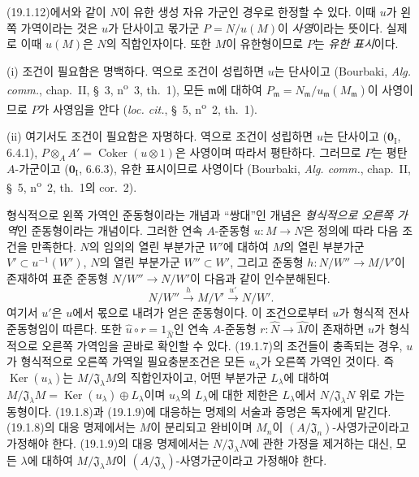 (19.1.12)에서와 같이 $N$이 유한 생성 자유 가군인 경우로 한정할 수
있다. 이때 $u$가 왼쪽 가역이라는 것은 $u$가 단사이고 몫가군
$P=N/u(M)$이 \emph{사영}이라는 뜻이다. 실제로 이때 $u(M)$은
$N$의 직합인자이다. 또한 $M$이 유한형이므로 $P$는 \emph{유한
표시}이다.

(i) 조건이 필요함은 명백하다. 역으로 조건이 성립하면 $u$는
단사이고 (Bourbaki, \emph{Alg. comm.}, chap.~II, §~3,
n\textsuperscript{o}~3, th.~1), 모든 $\mathfrak m$에 대하여
$P_{\mathfrak m}=N_{\mathfrak m}/
u_{\mathfrak m}(M_{\mathfrak m})$이 사영이므로 $P$가 사영임을 안다
(\emph{loc. cit.}, §~5, n\textsuperscript{o}~2, th.~1).

(ii) 여기서도 조건이 필요함은 자명하다. 역으로 조건이 성립하면
$u$는 단사이고 ($\mathbf{0}_{\mathrm I}$, 6.4.1),
$P\otimes_AA'=\operatorname{Coker}(u\otimes1)$은 사영이며 따라서
평탄하다. 그러므로 $P$는 평탄 $A$-가군이고
($\mathbf{0}_{\mathrm I}$, 6.6.3), 유한 표시이므로 사영이다
(Bourbaki, \emph{Alg. comm.}, chap.~II, §~5,
n\textsuperscript{o}~2, th.~1의 cor.~2).


\begin{remark}[19.1.15]
\label{0.19.1.15-fr}
형식적으로 왼쪽 가역인 준동형이라는 개념과 ``쌍대''인 개념은
\emph{형식적으로 오른쪽 가역}인 준동형이라는 개념이다. 그러한 연속
$A$-준동형 $u:M\to N$은 정의에 따라 다음 조건을 만족한다. $N$의
임의의 열린 부분가군 $W'$에 대하여 $M$의 열린 부분가군
$V'\subset u^{-1}(W')$, $N$의 열린 부분가군 $W''\subset W'$, 그리고
준동형 $h:N/W''\to M/V'$이 존재하여 표준 준동형 $N/W''\to N/W'$이
다음과 같이 인수분해된다.
\[
  N/W''\xrightarrow{h}M/V'\xrightarrow{u'}N/W'.
\]
여기서 $u'$은 $u$에서 몫으로 내려가 얻은 준동형이다. 이 조건으로부터
$u$가 형식적 전사 준동형임이 따른다. 또한
$\widehat u\circ r=1_{\widehat N}$인 연속 $\widehat A$-준동형
$r:\widehat N\to\widehat M$이 존재하면 $u$가 형식적으로 오른쪽
가역임을 곧바로 확인할 수 있다. (19.1.7)의 조건들이 충족되는 경우,
$u$가 형식적으로 오른쪽 가역일 필요충분조건은 모든 $u_\lambda$가
오른쪽 가역인 것이다. 즉 $\operatorname{Ker}(u_\lambda)$는
$M/\mathfrak J_\lambda M$의 직합인자이고, 어떤 부분가군 $L_\lambda$에
대하여 $M/\mathfrak J_\lambda M=
\operatorname{Ker}(u_\lambda)\oplus L_\lambda$이며 $u_\lambda$의
$L_\lambda$에 대한 제한은 $L_\lambda$에서
$N/\mathfrak J_\lambda N$ 위로 가는 동형이다. (19.1.8)과 (19.1.9)에
대응하는 명제의 서술과 증명은 독자에게 맡긴다. (19.1.8)의 대응
명제에서는 $M$이 분리되고 완비이며 $M_n$이
$(A/\mathfrak J_n)$-사영가군이라고 가정해야 한다. (19.1.9)의 대응
명제에서는 $N/\mathfrak J_\lambda N$에 관한 가정을 제거하는 대신,
모든 $\lambda$에 대하여 $M/\mathfrak J_\lambda M$이
$(A/\mathfrak J_\lambda)$-사영가군이라고 가정해야 한다.
\end{remark}

